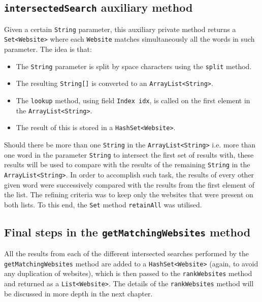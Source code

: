 \subsection{{\tt intersectedSearch} auxiliary method}
Given a certain {\tt String} parameter, this auxiliary private method returns a {\tt Set<Website>} where each {\tt Website} matches simultaneously all the words in such parameter. The idea is that:
\begin{itemize}
\item The {\tt String} parameter is split by space characters using the {\tt split} method.
\item The resulting {\tt String[]} is converted to an {\tt ArrayList<String>}.
\item The {\tt lookup} method, using field {\tt Index idx}, is called on the first element in the {\tt ArrayList<String>}.
\item The result of this is stored in a {\tt HashSet<Website>}.
\end{itemize}
Should there be more than one {\tt String} in the {\tt ArrayList<String>} i.e. more than one word in the parameter {\tt String} to intersect the first set of results with, these results will be used to compare with the results of the remaining {\tt String} in the {\tt ArrayList<String>}. In order to accomplish such task, the results of every other given word were successively compared with the results from the first element of the list. The refining criteria was to keep only the websites that were present on both lists.
To this end, the {\tt Set} method {\tt retainAll} was utilised.
\subsection{Final steps in the {\tt getMatchingWebsites} method}
All the results from each of the different intersected searches performed by the {\tt getMatchingWebsites} method are added to a {\tt HashSet<Website>} (again, to avoid any duplication of websites), which is then passed to the {\tt rankWebsites} method and returned as a {\tt List<Website>}. The details of the {\tt rankWebsites} method will be discussed in more depth in the next chapter.

